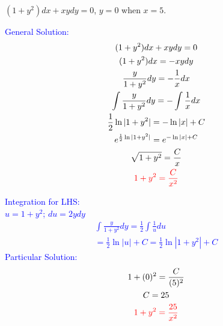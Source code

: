 \item $(1 + y^2) dx + xy dy = 0$, $y = 0$ when $x = 5$.

\textcolor{blue}{
    \begin{minipage}[t]{0.45\textwidth}
        General Solution:
        \begin{gather*}
            (1 + y^2) dx + xy dy = 0 \\
            (1 + y^2) dx = - xy dy \\
            \frac{y}{1+y^2}dy = -\frac{1}{x}dx\\
            \int\frac{y}{1+y^2}dy = -\int\frac{1}{x}dx\\
            \frac{1}{2}\ln|1+y^2| = -\ln|x|+C \\
            e^{\frac{1}{2}\ln|1+y^2|} = e^{-\ln|x|+C}\\
            \sqrt{1+y^2}=\frac{C}{x}\\
            \textcolor{red}{
            1+y^2=\frac{C}{x^2}
            }
        \end{gather*}
    \end{minipage}
    \hfill
    \begin{minipage}[t]{0.45\textwidth}
        Integration for LHS:\\
        $u=1+y^2$; $du=2ydy$
        \begin{gather*}
            \int\frac{y}{1+y^2}dy = \frac{1}{2}\int\frac{1}{u}du \\
            =\frac{1}{2}\ln|u|+C=\frac{1}{2}\ln|1+y^2|+C
        \end{gather*}
        Particular Solution:
        \begin{gather*}
            1+(0)^2=\frac{C}{(5)^2}\\
            C=25\\
            \textcolor{red}{
            1+y^2=\frac{25}{x^2}
            }
        \end{gather*}
    \end{minipage}
}